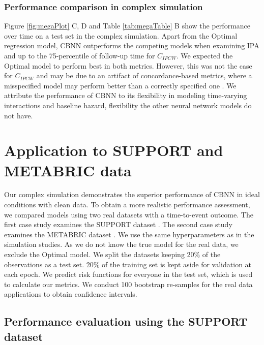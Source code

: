 \documentclass[AMA,STIX1COL,]{WileyNJD-v2}
\begin{document}
\hypertarget{performance-comparison-in-complex-simulation}{%
\subsubsection{Performance comparison in complex
simulation}\label{performance-comparison-in-complex-simulation}}

Figure \ref{fig:megaPlot} C, D and Table \ref{tab:megaTable} B show the
performance over time on a test set in the complex simulation. Apart
from the Optimal regression model, CBNN outperforms the competing models
when examining IPA and up to the 75-percentile of follow-up time for
\(C_{IPCW}\). We expected the Optimal model to perform best in both
metrics. However, this was not the case for \(C_{IPCW}\) and may be due
to an artifact of concordance-based metrics, where a misspecified model
may perform better than a correctly specified one
\citep{cindexfails2019}. We attribute the performance of CBNN to its
flexibility in modeling time-varying interactions and baseline hazard,
flexibility the other neural network models do not have.

\hypertarget{casestudies}{%
\section{Application to SUPPORT and METABRIC data}\label{casestudies}}

Our complex simulation demonstrates the superior performance of CBNN in
ideal conditions with clean data. To obtain a more realistic performance
assessment, we compared models using two real datasets with a
time-to-event outcome. The first case study examines the SUPPORT dataset
\citep{knaus1995SUPPORT}. The second case study examines the METABRIC
dataset \citep{curtis2012genomic}. We use the same hyperparameters as in
the simulation studies. As we do not know the true model for the real
data, we exclude the Optimal model. We split the datasets keeping 20\%
of the observations as a test set. 20\% of the training set is kept
aside for validation at each epoch. We predict risk functions for
everyone in the test set, which is used to calculate our metrics. We
conduct 100 bootstrap re-samples for the real data applications to
obtain confidence intervals.

\hypertarget{performance-evaluation-using-the-support-dataset}{%
\subsection{Performance evaluation using the SUPPORT
dataset}\label{performance-evaluation-using-the-support-dataset}}
\end{document}
